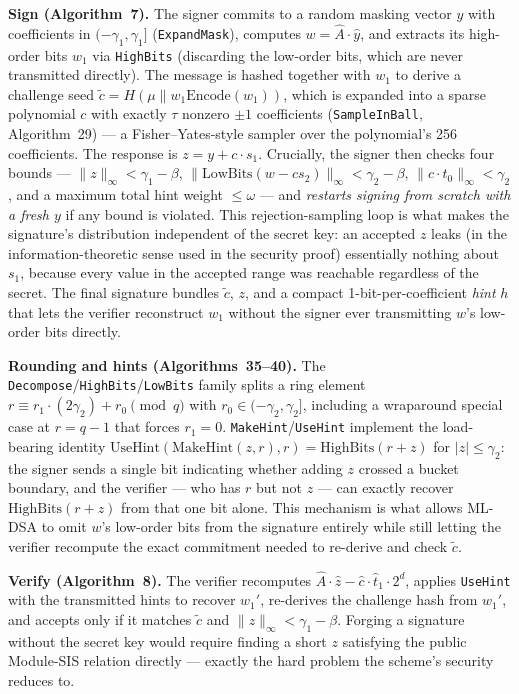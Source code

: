 \documentclass[10pt,conference]{IEEEtran}
\begin{document}
\textbf{Sign (Algorithm~7).} The signer commits to a random masking
vector $y$ with coefficients in $(-\gamma_1, \gamma_1]$
(\texttt{ExpandMask}), computes $w = \hat A \cdot \hat y$, and extracts
its high-order bits $w_1$ via \texttt{HighBits} (discarding the
low-order bits, which are never transmitted directly). The message is
hashed together with $w_1$ to derive a challenge seed
$\tilde c = H(\mu \| w_1\mathrm{Encode}(w_1))$, which is expanded into a
sparse polynomial $c$ with exactly $\tau$ nonzero $\pm 1$ coefficients
(\texttt{SampleInBall}, Algorithm~29) --- a Fisher--Yates-style sampler
over the polynomial's 256 coefficients. The response is
$z = y + c \cdot s_1$. Crucially, the signer then checks four bounds ---
$\|z\|_\infty < \gamma_1 - \beta$,
$\|\mathrm{LowBits}(w - c s_2)\|_\infty < \gamma_2 - \beta$,
$\|c \cdot t_0\|_\infty < \gamma_2$, and a maximum total hint weight
$\leq \omega$ --- and \emph{restarts signing from scratch with a fresh
$y$} if any bound is violated. This rejection-sampling loop is what makes
the signature's distribution independent of the secret key: an
accepted $z$ leaks (in the information-theoretic sense used in the
security proof) essentially nothing about $s_1$, because every value in
the accepted range was reachable regardless of the secret. The final
signature bundles $\tilde c$, $z$, and a compact 1-bit-per-coefficient
\emph{hint} $h$ that lets the verifier reconstruct $w_1$ without the
signer ever transmitting $w$'s low-order bits directly.

\textbf{Rounding and hints (Algorithms~35--40).} The
\texttt{Decompose}/\texttt{HighBits}/\texttt{LowBits} family splits a
ring element $r \equiv r_1 \cdot (2\gamma_2) + r_0 \pmod q$ with
$r_0 \in (-\gamma_2, \gamma_2]$, including a wraparound special case at
$r = q-1$ that forces $r_1 = 0$. \texttt{MakeHint}/\texttt{UseHint}
implement the load-bearing identity
$\mathrm{UseHint}(\mathrm{MakeHint}(z, r), r) = \mathrm{HighBits}(r+z)$
for $|z| \leq \gamma_2$: the signer sends a single bit indicating whether
adding $z$ crossed a bucket boundary, and the verifier --- who has $r$
but not $z$ --- can exactly recover $\mathrm{HighBits}(r+z)$ from that
one bit alone. This mechanism is what allows ML-DSA to omit $w$'s
low-order bits from the signature entirely while still letting the
verifier recompute the exact commitment needed to re-derive and check
$\tilde c$.

\textbf{Verify (Algorithm~8).} The verifier recomputes
$\hat A \cdot \hat z - \hat c \cdot \hat t_1 \cdot 2^d$, applies
\texttt{UseHint} with the transmitted hints to recover $w_1'$, re-derives
the challenge hash from $w_1'$, and accepts only if it matches $\tilde c$
and $\|z\|_\infty < \gamma_1 - \beta$. Forging a signature without the
secret key would require finding a short $z$ satisfying the public
Module-SIS relation directly --- exactly the hard problem the scheme's
security reduces to.
\end{document}
